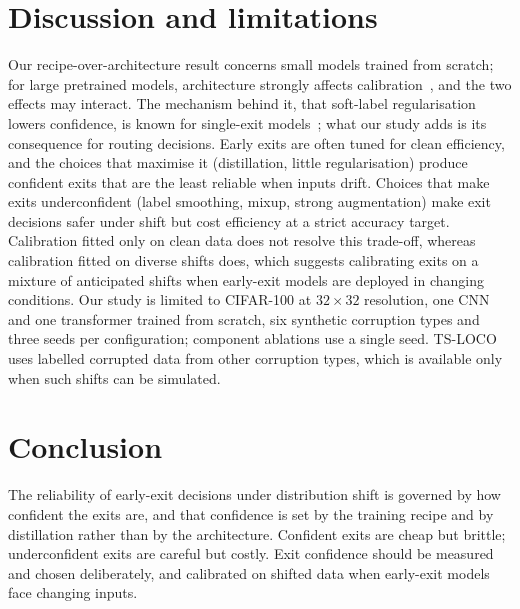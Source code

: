 \documentclass[10pt]{article}
\begin{document}
\section{Discussion and limitations}
Our recipe-over-architecture result concerns small models trained from scratch; for large pretrained models,
architecture strongly affects calibration~\citep{minderer2021revisiting}, and the two effects may interact. The
mechanism behind it, that soft-label regularisation lowers confidence, is known for single-exit
models~\citep{muller2019labelsmoothing,thulasidasan2019mixup,wang2023pitfall}; what our study adds is its consequence
for routing decisions. Early exits are often tuned for clean efficiency, and the choices that maximise it (distillation, little
regularisation) produce confident exits that are the least reliable when inputs drift. Choices that make exits
underconfident (label smoothing, mixup, strong augmentation) make exit decisions safer under shift but cost
efficiency at a strict accuracy target. Calibration fitted only on clean data does not resolve this trade-off,
whereas calibration fitted on diverse shifts does, which suggests calibrating exits on a mixture of anticipated
shifts when early-exit models are deployed in changing conditions. Our study is limited to CIFAR-100 at $32\times32$
resolution, one CNN and one transformer trained from scratch, six synthetic corruption types and three seeds per
configuration; component ablations use a single seed. TS-LOCO uses labelled corrupted data from other corruption
types, which is available only when such shifts can be simulated.

\section{Conclusion}
The reliability of early-exit decisions under distribution shift is governed by how confident the exits are, and
that confidence is set by the training recipe and by distillation rather than by the architecture. Confident exits
are cheap but brittle; underconfident exits are careful but costly. Exit confidence should be measured and chosen
deliberately, and calibrated on shifted data when early-exit models face changing inputs.



\end{document}
